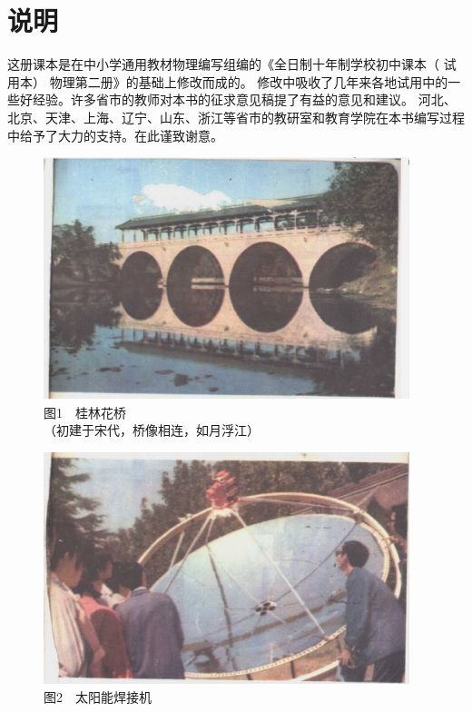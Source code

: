 
\chapter{说明}

这册课本是在中小学通用教材物理编写组编的《全日制十年制学校初中课本（ 试用本） 物理第二册》的基础上修改而成的。
修改中吸收了几年来各地试用中的一些好经验。许多省市的教师对本书的征求意见稿提了有益的意见和建议。
河北、北京、天津、上海、辽宁、山东、浙江等省市的教研室和教育学院在本书编写过程中给予了大力的支持。在此谨致谢意。

\newpage

\begin{figure}[H]
    \centering
    \includegraphics[width=0.95\textwidth]{../pic/czwl2-pic1}
    \caption*{图1　桂林花桥\\（初建于宋代，桥像相连，如月浮江）}\label{fig:pic1}
\end{figure}

\begin{figure}[H]
    \centering
    \includegraphics[width=0.95\textwidth]{../pic/czwl2-pic2}
    \caption*{图2　太阳能焊接机}\label{fig:pic2}
\end{figure}

